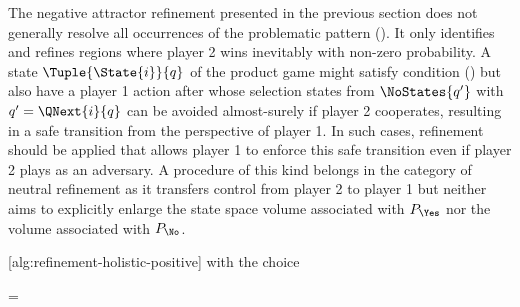 \startsubsection[title={Safety},reference=sec:refinement-holistic-safety]


    The negative attractor refinement presented in the previous section does not generally resolve all occurrences of the problematic pattern ().
    It only identifies and refines regions where player 2 wins inevitably with non-zero probability.
    A state $\Tuple{\State{i}}{q}$ of the product game might satisfy condition () but also have a player 1 action after whose selection states from $\NoStates{q'}$ with $q' = \QNext{i}{q}$ can be avoided almost-surely if player 2 cooperates, resulting in a safe transition from the perspective of player 1.
    In such cases, refinement should be applied that allows player 1 to enforce this safe transition even if player 2 plays as an adversary.
    A procedure of this kind belongs in the category of neutral refinement as it transfers control from player 2 to player 1 but neither aims to explicitly enlarge the state space volume associated with $P_\Yes$ nor the volume associated with $P_\No$.

    [alg:refinement-holistic-positive] with the choice

    \startformula
         = 
    \stopformula

